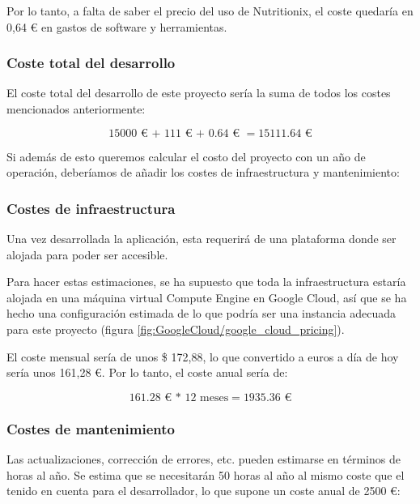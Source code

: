 Por lo tanto, a falta de saber el precio del uso de Nutritionix, el coste quedaría en 0,64 € en gastos de software y herramientas.

\subsubsection{Coste total del desarrollo}

El coste total del desarrollo de este proyecto sería la suma de todos los costes mencionados anteriormente:

\[\num{15000} \text{ € + } \num{111} \text{ € + } \num{0,64} \text{ € } = \num{15111,64} \text{ €}\]

Si además de esto queremos calcular el costo del proyecto con un año de operación, deberíamos de añadir los costes de infraestructura y mantenimiento:

\subsubsection{Costes de infraestructura}

Una vez desarrollada la aplicación, esta requerirá de una plataforma donde ser alojada para poder ser accesible. 

Para hacer estas estimaciones, se ha supuesto que toda la infraestructura estaría alojada en una máquina virtual Compute Engine en Google Cloud, así que se ha hecho una configuración estimada de lo que podría ser una instancia adecuada para este proyecto (figura \ref{fig:GoogleCloud/google_cloud_pricing}). 

El coste mensual sería de unos \$ 172,88, lo que convertido a euros a día de hoy sería unos 161,28 €. Por lo tanto, el coste anual sería de:

\[\num{161,28} \text{ € * } 12 \text{ meses} = \num{1935,36} \text{ €}\]


\subsubsection{Costes de mantenimiento}

Las actualizaciones, corrección de errores, etc. pueden estimarse en términos de horas al año. Se estima que se necesitarán 50 horas al año al mismo coste que el tenido en cuenta para el desarrollador, lo que supone un coste anual de \num{2500} €:

